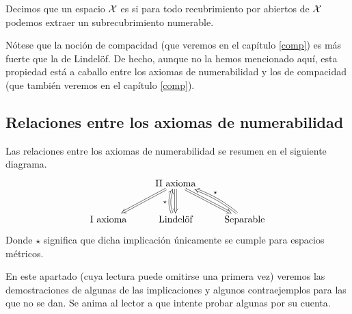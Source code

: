 \begin{defi}[Lindelöf]
	\label{lindel}
	Decimos que un espacio $\mathcal{X}$ es  si para todo recubrimiento por abiertos de $\mathcal{X}$ podemos extraer un subrecubrimiento numerable.
\end{defi}

\begin{obs}
	Nótese que la noción de compacidad (que veremos en el capítulo \ref{comp}) es más fuerte que la de Lindelöf. De hecho, aunque no la hemos mencionado aquí, esta propiedad está a caballo entre los axiomas de numerabilidad y los de compacidad (que también veremos en el capítulo \ref{comp}).
\end{obs}

\subsection{Relaciones entre los axiomas de numerabilidad}
Las relaciones entre los axiomas de numerabilidad se resumen en el siguiente diagrama.
\begin{equation*}
	\xymatrix{
		& \text{II axioma}\ar@{=>}[dl]\ar@{=>}[d]\ar@{=>}[dr]&\\
		\text{I axioma} & \text{Lindelöf}\ar@{=>}@/^/[u]^{\star} & \text{Separable}\ar@{=>}@/_/[ul]_{\star}
	}
\end{equation*}
Donde $\star$ significa que dicha implicación únicamente se cumple para espacios métricos.

En este apartado (cuya lectura puede omitirse una primera vez) veremos las demostraciones de algunas de las implicaciones y algunos contraejemplos para las que no se dan. Se anima al lector a que intente probar algunas por su cuenta.

